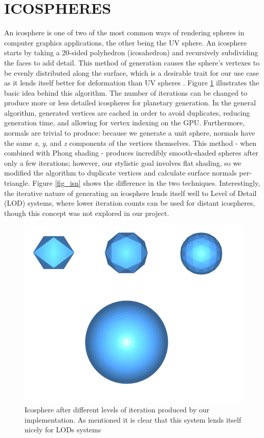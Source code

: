\documentclass[a4paper,twoside]{article}
\begin{document}
\section{\uppercase{IcoSpheres}}
\label{sec:icosphere}
\noindent An icosphere is one of two of the most common ways of rendering spheres in computer graphics applications, the other being the UV sphere. An icosphere starts by taking a 20-sided polyhedron (icosahedron)  and recursively subdividing the faces to add detail. This method of generation causes the sphere's vertexes to be evenly distributed along the surface, which is a desirable trait for our use case as it lends itself better for deformation than UV spheres \cite{pnoise}. Figure \ref{fig_isa} illustrates the basic idea behind this algorithm. The number of iterations can be changed to produce more or less detailed icospheres for planetary generation.
In the general algorithm, generated vertices are cached in order to avoid duplicates, reducing generation time, and allowing for vertex indexing on the GPU. Furthermore, normals are trivial to produce: because we generate a unit sphere, normals have the same \textit{x}, \textit{y}, and \textit{z} components of the vertices themselves. This method - when combined with Phong shading - produces incredibly smooth-shaded spheres after only a few iterations; however, our stylistic goal involves flat shading, so we modified the algorithm to duplicate vertices and calculate surface normals per-triangle. Figure \ref{fig_isn} shows the difference in the two techniques. Interestingly, the iterative nature of generating an icosphere lends itself well to Level of Detail (LOD) systems, where lower iteration counts can be used for distant icospheres, though this concept was not explored in our project.

\begin{figure}
\includegraphics[scale=0.24]{./images/icospheres/icosphereslod.png}
\caption{Icosphere after different levels of iteration produced by our implementation. As mentioned it is clear that this system lends itself nicely for LODs systems}
\label{fig_isa}
\end{figure}
\end{document}

